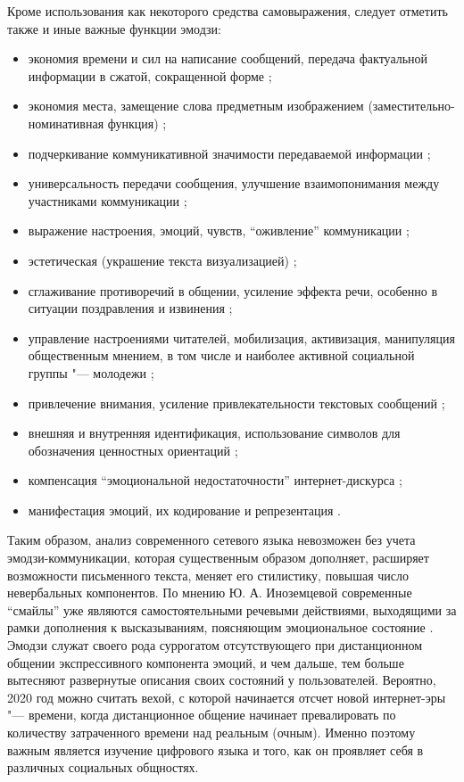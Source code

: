 Кроме использования как некоторого средства самовыражения, следует отметить также и иные важные функции эмодзи:
\begin{itemize}
	\item экономия времени и сил на написание сообщений, передача фактуальной информации в сжатой, сокращенной форме \cite{Krylov,Pervukhina,FrolovFrolova};
	\item экономия места, замещение слова предметным изображением (заместительно-номинативная функция) \cite{Kosmarskaya}; 
	\item подчеркивание коммуникативной значимости передаваемой информации \cite{Tverdokhleb}; 
	\item универсальность передачи сообщения, улучшение взаимопонимания между участниками коммуникации \cite{Vinogradova,Inozemtseva2010,Inozemtseva2009}; 
	\item выражение настроения, эмоций, чувств, “оживление” коммуникации \cite{FrolovFrolova}; 
	\item эстетическая (украшение текста визуализацией) \cite{Kosmarskaya}; 
	\item сглаживание противоречий в общении, усиление эффекта речи, особенно в ситуации поздравления и извинения \cite{Pervukhina,Sampietro}; 
	\item управление настроениями читателей, мобилизация, активизация, манипуляция общественным мнением, в том числе и наиболее активной социальной группы "--- молодежи \cite{Voinov}; 
	\item привлечение внимания, усиление привлекательности текстовых сообщений \cite{ShapovalovaGusarovaDobrenko}; 
	\item внешняя и внутренняя идентификация, использование символов для обозначения ценностных ориентаций \cite{Voinov}; 
	\item компенсация “эмоциональной недостаточности” интернет-дискурса \cite{RyabkoFlyug}; 
	\item манифестация эмоций, их кодирование и репрезентация \cite{Mozgovaya}.
\end{itemize}

Таким образом, анализ современного сетевого языка невозможен без учета эмодзи-коммуникации, которая существенным образом дополняет, расширяет возможности письменного текста, меняет его стилистику, повышая число невербальных компонентов. По мнению Ю. А. Иноземцевой современные “смайлы” уже являются самостоятельными речевыми действиями, выходящими за рамки дополнения к высказываниям, поясняющим эмоциональное состояние \cite{Inozemtseva2010,Inozemtseva2009}. Эмодзи служат своего рода суррогатом отсутствующего при дистанционном общении экспрессивного компонента эмоций, и чем дальше, тем больше вытесняют развернутые описания своих состояний у пользователей. Вероятно, 2020 год можно считать вехой, с которой начинается отсчет новой интернет-эры "--- времени, когда дистанционное общение начинает превалировать по количеству затраченного времени над реальным (очным). Именно поэтому важным является изучение цифрового языка и того, как он проявляет себя в различных социальных общностях.

